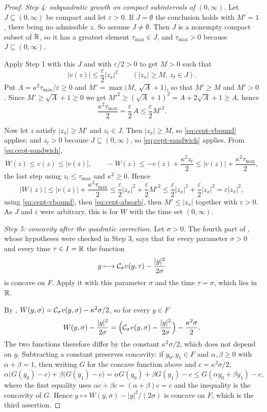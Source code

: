 \begin{proof}
\emph{Step 4: subquadratic growth on compact subintervals of $(0,\infty)$.}
Let $J\subseteq(0,\infty)$ be compact and let $\varepsilon>0$. If $J=\emptyset$ the
conclusion holds with $M'=1$, there being no admissible $z$. So assume $J\ne\emptyset$.
Then $J$ is a nonempty compact subset of $\mathbb{R}$, so it has a greatest element
$\tau_{\max}\in J$, and $\tau_{\max}>0$ because $J\subseteq(0,\infty)$.

Apply Step 1 with this $J$ and with $\varepsilon/2>0$ to get $M>0$ such that
\begin{equation}\label{eq:cept-vbound}
  |v(z)|\le\frac\varepsilon2|z_x|^2\qquad(|z_x|\ge M,\ z_t\in J).
\end{equation}
Put $A=\kappa^2\tau_{\max}/\varepsilon\ge0$ and
$M'=\max\bigl(M,\ \sqrt A+1\bigr)$, so that $M'\ge M$ and $M'>0$. Since
$M'\ge\sqrt A+1\ge0$ we get $M'^2\ge(\sqrt A+1)^2=A+2\sqrt A+1\ge A$, hence
\begin{equation}\label{eq:cept-absorb}
  \frac{\kappa^2\tau_{\max}}{2}=\frac\varepsilon2\,A\le\frac\varepsilon2M'^2 .
\end{equation}

Now let $z$ satisfy $|z_x|\ge M'$ and $z_t\in J$. Then $|z_x|\ge M$, so
\eqref{eq:cept-vbound} applies; and $z_t>0$ because $J\subseteq(0,\infty)$, so
\eqref{eq:cept-sandwich} applies. From \eqref{eq:cept-sandwich},
\[
  W(z)\le v(z)\le|v(z)|,\qquad
  -W(z)\le-v(z)+\frac{\kappa^2z_t}{2}\le|v(z)|+\frac{\kappa^2\tau_{\max}}{2},
\]
the last step using $z_t\le\tau_{\max}$ and $\kappa^2\ge0$. Hence
\[
  |W(z)|\le|v(z)|+\frac{\kappa^2\tau_{\max}}{2}
   \le\frac\varepsilon2|z_x|^2+\frac\varepsilon2M'^2
   \le\frac\varepsilon2|z_x|^2+\frac\varepsilon2|z_x|^2
   =\varepsilon|z_x|^2 ,
\]
using \eqref{eq:cept-vbound}, then \eqref{eq:cept-absorb}, then $M'\le|z_x|$ together
with $\varepsilon>0$. As $J$ and $\varepsilon$ were arbitrary, this is
 for $W$ with the time set $(0,\infty)$.

\emph{Step 5: concavity after the quadratic correction.}
Let $\sigma>0$. The fourth part of , whose hypotheses were
checked in Step 3, says that for every parameter $\sigma>0$ and every time $\tau\in I=\mathbb{R}$
the function
\[
  y\longmapsto\mathcal{C}_\sigma v(y,\tau)-\frac{|y|^2}{2\sigma}
\]
is concave on $F$. Apply it with this parameter $\sigma$ and the time $\tau=\sigma$,
which lies in $\mathbb{R}$.

By , $W(y,\sigma)=\mathcal{C}_\sigma v(y,\sigma)-\kappa^2\sigma/2$, so for
every $y\in F$
\[
  W(y,\sigma)-\frac{|y|^2}{2\sigma}
   =\Bigl(\mathcal{C}_\sigma v(y,\sigma)-\frac{|y|^2}{2\sigma}\Bigr)-\frac{\kappa^2\sigma}{2}.
\]
The two functions therefore differ by the constant $\kappa^2\sigma/2$, which does not
depend on $y$. Subtracting a constant preserves concavity: if $y_0,y_1\in F$ and
$\alpha,\beta\ge0$ with $\alpha+\beta=1$, then writing $G$ for the concave function above
and $c=\kappa^2\sigma/2$,
\[
  \alpha\bigl(G(y_0)-c\bigr)+\beta\bigl(G(y_1)-c\bigr)
   =\alpha G(y_0)+\beta G(y_1)-c
   \le G(\alpha y_0+\beta y_1)-c,
\]
where the first equality uses $\alpha c+\beta c=(\alpha+\beta)c=c$ and the inequality is
the concavity of $G$. Hence $y\mapsto W(y,\sigma)-|y|^2/(2\sigma)$ is concave on $F$,
which is the third assertion.
\end{proof}
